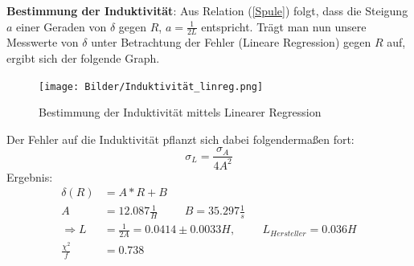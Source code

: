 \documentclass[12pt,a4paper]{article}
\begin{document}
\textbf{Bestimmung der Induktivität}: \newline
Aus Relation (\ref{Spule}) folgt, dass die Steigung $a$ einer Geraden von $\delta$ gegen $R$, $a=\frac{1}{2L}$ entspricht.
Trägt man nun unsere Messwerte von $\delta$ unter Betrachtung der Fehler (Lineare Regression) gegen $R$ auf, ergibt sich der folgende Graph.
\begin{figure}[H]
\caption{Bestimmung der Induktivität mittels Linearer Regression}
\centering
\texttt{[image: Bilder/Induktivität\_linreg.png]}
\end{figure}
Der Fehler auf die Induktivität pflanzt sich dabei folgendermaßen fort:
\begin{equation}
\sigma_L=\frac{\sigma_A}{4A^2}
\end{equation}
Ergebnis:
\begin{align*}
\delta(R) &= A*R+B \\
A&=12.087 \frac{1}{H} \hspace{1cm} B=35.297 \frac{1}{s} \\
\Rightarrow L&=\frac{1}{2A}=0.0414 \pm 0.0033 H, \hspace{1cm} L_{Hersteller}=0.036 H\\
\frac{\chi^2}{f}&=0.738
\end{align*}
\end{document}

